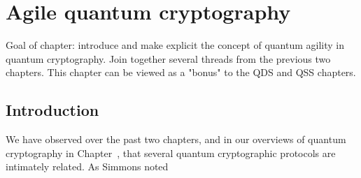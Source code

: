 \chapter{Agile quantum cryptography}\label{chapter:aqc}
Goal of chapter: introduce and make explicit the concept of quantum agility in quantum cryptography. Join together several threads from the previous two chapters. This chapter can be viewed as a "bonus" to the QDS and QSS chapters.

\iffalse
Key things I want to present, in roughly the order that I want to present them:

\begin{itemize}
\item Discussion of agility and why it might be desirable. Motivate it in terms of my two literature reviews.
\item Modification of QDS protocol from earlier to be agile with QSS (i.e. introduce protocol QSS-b and prove its security (inc postselection)). Have some graphs of its behaviour
\item Bring in QKD from the literature (Papanastasiou2018). Have some graphs of its behaviour and discussion of how it relates to my thesis.
\item Talk about the experiment (emphasise that it is not my work). I can have some plots of raw data (opendata), and make graphs of data points which I received.
\item Analysis of the data under each protocol with discussion of how results from previous chapters are modified to make them more realistic
\item Graphs of performance at different data parameters
\item Table from the AQC paper $\leftarrow$ this can be the climax of this section
\item star graph of QDS
\item Discussion of how our analysis motivates agility
\item Outlook/next steps
\end{itemize}
\fi

\section{Introduction}

We have observed over the past two chapters, and in our overviews of quantum cryptography in Chapter~, that several quantum cryptographic protocols are intimately related. As Simmons noted

